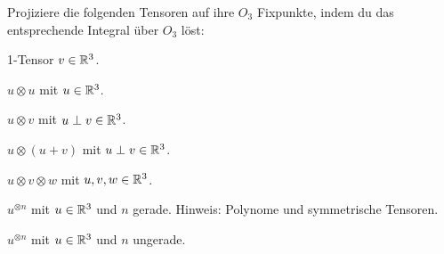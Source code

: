 \begin{sheet}
\begin{problem}[title={Tensoren auf $O_3$-Fixpunkte projizieren}]
	\label{aufg:TensorfixProj}
	Projiziere die folgenden Tensoren auf ihre $O_3$ Fixpunkte, indem du das entsprechende Integral über $O_3$ löst:
	\begin{subproblem}
		1-Tensor $v\in\mathbb{R}^3$.
	\end{subproblem}
	\begin{subproblem}
		$u\otimes u$ mit $u \in \mathbb{R}^3$.
	\end{subproblem}
	\begin{subproblem}
		$u\otimes v$ mit $u\perp v \in \mathbb{R}^3$.
	\end{subproblem}
	\begin{subproblem}
		$u\otimes (u+v)$ mit $u\perp v \in \mathbb{R}^3$.
	\end{subproblem}
	\begin{subproblem}
		$u\otimes v \otimes w$ mit $u,v,w \in \mathbb{R}^3$.
	\end{subproblem}
	\begin{subproblem}
		\label{aufg:TensorfixProjgeradeu}
		$u^{\otimes n}$ mit $u \in \mathbb{R}^3$ und $n$ gerade. Hinweis: Polynome und symmetrische Tensoren.
	\end{subproblem}
	\begin{subproblem}
		\label{aufg:TensorfixProjungeradeu}
		$u^{\otimes n}$ mit $u \in \mathbb{R}^3$ und $n$ ungerade.
	\end{subproblem}
\end{problem}
\end{sheet}
